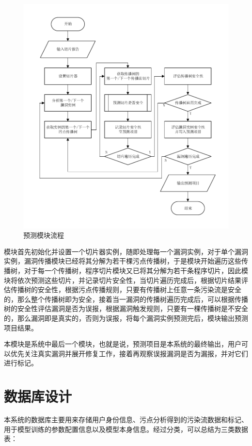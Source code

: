 \begin{figure}[htbp]
    \centering
    \includegraphics[width=0.9\linewidth]{FIGs/chapter3/predictProcessing.pdf}
    \caption{预测模块流程}\label{predictProcessing}
\end{figure}

模块首先初始化并设置一个切片器实例，随即处理每一个漏洞实例，对于单个漏洞实例，漏洞传播模块已经将其分解为若干棵污点传播树，于是模块开始遍历这些传播树，对于每一个传播树，程序切片模块又已将其分解为若干条程序切片，因此模块将依次预测这些切片，并记录切片安全性，当切片遍历完成后，根据切片结果评估传播树的安全性，根据污点传播规则，只要有传播树上任意一条污染流是安全的，那么整个传播树即为安全，接着当一漏洞的传播树遍历完成后，可以根据传播树的安全性评估漏洞是否为误报，根据漏洞触发规则，只要有一棵传播树是不安全的，那么漏洞即是真实的，否则为误报，将每个漏洞实例预测完后，模块输出预测项目结果。

本模块是系统中最后一个模块，也就是说，预测项目是本系统的最终输出，用户可以优先关注真实漏洞并展开修复工作，接着再观察误报漏洞是否为漏报，并对它们进行标记。

\section{数据库设计}
本系统的数据库主要用来存储用户身份信息、污点分析得到的污染流数据和标记、用于模型训练的参数配置信息以及模型本身信息。经过分类，可以总结为三类数据表：

